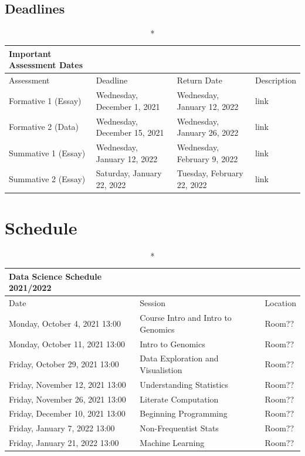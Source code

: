 \documentclass[
]{book}
\begin{document}
\hypertarget{deadlines}{%
\subsection{Deadlines}\label{deadlines}}

\captionsetup[table]{labelformat=empty,skip=1pt}
\begin{longtable}{llll}
\caption*{
{\large Important Assessment Dates}
} \\ 
\toprule
Assessment & Deadline & Return Date & Description \\ 
\midrule
Formative 1 (Essay) & Wednesday, December 1, 2021 & Wednesday, January 12, 2022 & link \\ 
Formative 2 (Data) & Wednesday, December 15, 2021 & Wednesday, January 26, 2022 & link \\ 
Summative 1 (Essay) & Wednesday, January 12, 2022 & Wednesday, February 9, 2022 & link \\ 
Summative 2 (Essay) & Saturday, January 22, 2022 & Tuesday, February 22, 2022 & link \\ 
 \bottomrule
\end{longtable}

\hypertarget{schedule}{%
\section{Schedule}\label{schedule}}

\captionsetup[table]{labelformat=empty,skip=1pt}
\begin{longtable}{lll}
\caption*{
{\large Data Science Schedule 2021/2022}
} \\ 
\toprule
Date & Session & Location \\ 
\midrule
Monday, October 4, 2021 13:00 & Course Intro and Intro to Genomics & Room?? \\ 
Monday, October 11, 2021 13:00 & Intro to Genomics & Room?? \\ 
Friday, October 29, 2021 13:00 & Data Exploration and Visualistion & Room?? \\ 
Friday, November 12, 2021 13:00 & Understanding Statistics & Room?? \\ 
Friday, November 26, 2021 13:00 & Literate Computation & Room?? \\ 
Friday, December 10, 2021 13:00 & Beginning Programming & Room?? \\ 
Friday, January 7, 2022 13:00 & Non-Frequentist Stats & Room?? \\ 
Friday, January 21, 2022 13:00 & Machine Learning & Room?? \\ 
 \bottomrule
\end{longtable}
\end{document}

